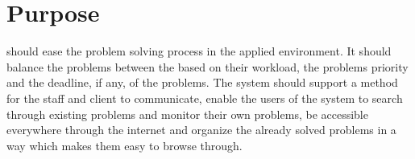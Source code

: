 \section{Purpose}
\hdesk[] should ease the problem solving process in the applied environment. 
It should balance the problems between the \astaff[] based on their workload, the problems priority and the deadline, if any, of the problems.
The system should support a method for the staff and client to communicate, enable the users of the system to search through existing problems and monitor their own problems, be accessible everywhere through the internet and organize the already solved problems in a way which makes them easy to browse through.


